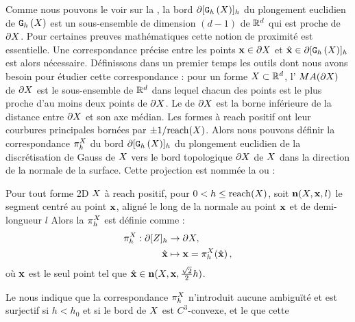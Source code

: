 Comme nous pouvons le voir sur la , la bord
$\partial\lbrack \mathtt{G}_{h}\left(X\right) \rbrack_{h}$ du plongement euclidien de $\mathtt{G}_{h}\left(X\right)$ est un sous-ensemble
de dimension $(d-1)$ de $\mathbb{R}^d$ qui est proche de $\partial X$. Pour
certaines preuves mathématiques cette notion de proximité est essentielle. Une
correspondance précise entre les points $\mathbf{x} \in \partial X$ et $\hat{\mathbf{x}}\in
\partial\lbrack \mathtt{G}_{h}\left(X\right) \rbrack_{h}$ est alors nécessaire. Définissons dans un premier temps
les outils dont nous avons besoin pour étudier cette correspondance : pour un
forme $X \subset \mathbb{R}^d$, l' $MA(\partial X)$ de $\partial X$ est le
sous-ensemble de $\mathbb{R}^d$ dans lequel chacun des points est le plus proche d'au
moins deux points de $\partial X$. Le  de $\partial X$ est la borne
inférieure de la distance entre $\partial X$ et son axe médian. Les formes à reach
positif ont leur courbures principales bornées par $\pm 1 / \mathrm{reach}(X)$.
%
%
Alors nous pouvons définir la correspondance $\pi_h^{X}$ du bord
$\partial\lbrack \mathtt{G}_{h}\left(X\right) \rbrack_{h}$ du plongement euclidien de la discrétisation de Gauss
de $X$ vers le bord topologique $\partial X$ de $X$ dans la direction de la
normale de la surface. Cette projection est nommée la  ou  \cite{Lachaud2006HDR} :
%
\begin{definition}{}
\label{def:projection}
%
  Pour tout forme 2D $X$ à reach positif, pour $0 < h \le \mathrm{reach}(X)$,
  soit $\mathbf{n}(X,\mathbf{x},l)$ le segment centré au point $\mathbf{x}$, aligné le
  long de la normale au point $\mathbf{x}$ et de demi-longueur $l$ Alors la
   $\pi_h^{X}$ est définie comme :
  \begin{align}
    \pi_h^{X}: \partial\lbrack Z \rbrack_{h} &\rightarrow \partial X, \nonumber \\
    \hat{\mathbf{x}} &\mapsto \mathbf{x}=\pi_h^{X}(\hat{\mathbf{x}}) \,,
  \end{align}
  où $\mathbf{x}$ est le seul point tel que $\hat{\mathbf{x}} \in
  \mathbf{n}(X,\mathbf{x},\frac{\sqrt{2}}{2}h)$.
%
\end{definition}
%
Le  nous indique que la correspondance $\pi_h^{X}$
n'introduit aucune ambiguïté et est surjectif si $h < h_0$ et si le bord de
$X$ est $C^3$-convexe, et le  que cette
